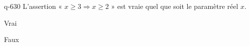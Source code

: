 \begin{truefalse}{q-630}
L'assertion « $x\geq 3 \Rightarrow x \geq 2$ » est vraie quel que soit le paramètre réel $x$.
\item* Vrai
\item Faux
\end{truefalse}

